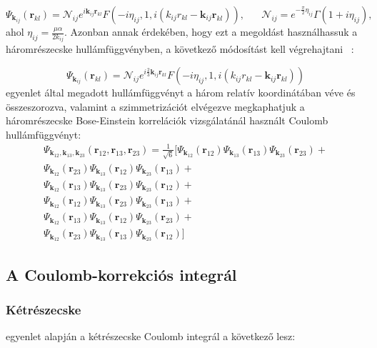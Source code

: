 \documentclass[11pt,a4paper]{article}
\numberwithin{equation}{subsection}
\numberwithin{figure}{section}
\begin{document}
\begin{equation}
\Psi_{\bm{k}_{ij}}(\bm{r}_{kl}) = \mathcal{N}_{ij}e^{i\bm{k}_{ij}\bm{r}_{kl}}F(-i\eta_{ij},1,i(k_{ij}r_{kl}-\bm{k}_{ij}\bm{r}_{kl})),\;\;\;\;\;\;
\mathcal{N}_{ij}=e^{-\frac{\pi}{2}\eta_{ij}}\Gamma(1+i\eta_{ij}),
\end{equation}
ahol $\eta_{ij}=\frac{\mu\alpha}{2k_{ij}}$. Azonban annak érdekében, hogy ezt a megoldást használhassuk a háromrészecske hullámfüggvényben, a következő módosítást kell végrehajtani  ~\cite{Alt:1998nr,Biyajima:2003ey, Mizoguchi:2000km}:

\begin{equation}
\Psi_{\bm{k}_{ij}}(\bm{r}_{kl}) = \mathcal{N}_{ij}e^{i\frac{2}{3}\bm{k}_{ij}\bm{r}_{kl}}F(-i\eta_{ij},1,i(k_{ij}r_{kl}-\bm{k}_{ij}\bm{r}_{kl}))
\label{eq:Psikij}
\end{equation}
 egyenlet által megadott hullámfüggvényt a három relatív koordinátában véve és összeszorozva, valamint a szimmetrizációt elvégezve megkaphatjuk a háromrészecske Bose-Einstein korrelációk vizsgálatánál használt Coulomb hullámfüggvényt:
\begin{equation}
\begin{aligned}
\Psi_{\bm{k}_{12}, \bm{k}_{13}, \bm{k}_{23}}(\bm{r}_{12},\bm{r}_{13},\bm{r}_{23})  = \frac{1}{\sqrt{6}}\Bigg[
\Psi_{\bm{k}_{12}}(\bm{r}_{12})\Psi_{\bm{k}_{13}}(\bm{r}_{13})\Psi_{\bm{k}_{23}}(\bm{r}_{23})+\\
\Psi_{\bm{k}_{12}}(\bm{r}_{23})\Psi_{\bm{k}_{13}}(\bm{r}_{12})\Psi_{\bm{k}_{23}}(\bm{r}_{13})+\\ 
\Psi_{\bm{k}_{12}}(\bm{r}_{13})\Psi_{\bm{k}_{13}}(\bm{r}_{23})\Psi_{\bm{k}_{23}}(\bm{r}_{12})+\\
\Psi_{\bm{k}_{12}}(\bm{r}_{12})\Psi_{\bm{k}_{13}}(\bm{r}_{23})\Psi_{\bm{k}_{23}}(\bm{r}_{13})+\\
\Psi_{\bm{k}_{12}}(\bm{r}_{13})\Psi_{\bm{k}_{13}}(\bm{r}_{12})\Psi_{\bm{k}_{23}}(\bm{r}_{23})+\\
\Psi_{\bm{k}_{12}}(\bm{r}_{23})\Psi_{\bm{k}_{13}}(\bm{r}_{13})\Psi_{\bm{k}_{23}}(\bm{r}_{12})
\Bigg]
\end{aligned}
\end{equation}


\subsection{A Coulomb-korrekciós integrál}

\subsubsection{Kétrészecske}
 egyenlet alapján a kétrészecske Coulomb integrál a következő lesz:
\end{document}
